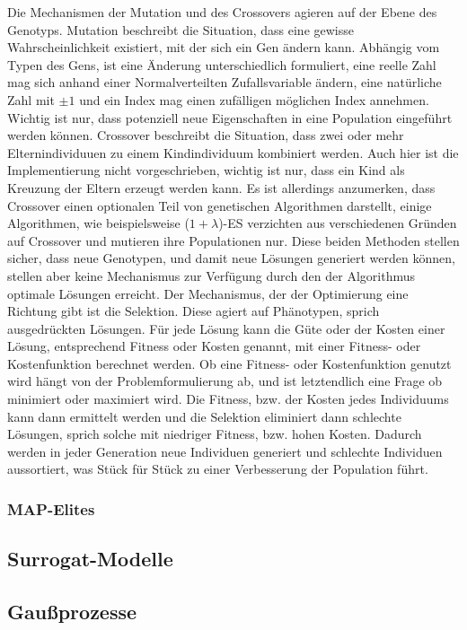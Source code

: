 Die Mechanismen der Mutation und des Crossovers agieren auf der Ebene des Genotyps.
Mutation beschreibt die Situation, dass eine gewisse Wahrscheinlichkeit existiert, mit der sich ein Gen ändern kann. Abhängig vom Typen des Gens, ist eine Änderung unterschiedlich formuliert, eine reelle Zahl mag sich anhand einer Normalverteilten Zufallsvariable ändern, eine natürliche Zahl mit $\pm1$ und ein Index mag einen zufälligen möglichen Index annehmen. Wichtig ist nur, dass potenziell neue Eigenschaften in eine Population eingeführt werden können.
Crossover beschreibt die Situation, dass zwei oder mehr Elternindividuuen zu einem Kindindividuum kombiniert werden. Auch hier ist die Implementierung nicht vorgeschrieben, wichtig ist nur, dass ein Kind als Kreuzung der Eltern erzeugt werden kann.
Es ist allerdings anzumerken, dass Crossover einen optionalen Teil von genetischen Algorithmen darstellt, einige Algorithmen, wie beispielsweise ($1 + \lambda$)-ES verzichten aus verschiedenen Gründen auf Crossover und mutieren ihre Populationen nur.
Diese beiden Methoden stellen sicher, dass neue Genotypen, und damit neue Lösungen generiert werden können, stellen aber keine Mechanismus zur Verfügung durch den der Algorithmus optimale Lösungen erreicht.
Der Mechanismus, der der Optimierung eine Richtung gibt ist die Selektion.
Diese agiert auf Phänotypen, sprich ausgedrückten Lösungen.
Für jede Lösung kann die Güte oder der Kosten einer Lösung, entsprechend Fitness oder Kosten genannt, 
mit einer Fitness- oder Kostenfunktion berechnet werden.
Ob eine Fitness- oder Kostenfunktion genutzt wird hängt von der Problemformulierung ab, und ist letztendlich eine Frage ob minimiert oder maximiert wird.
Die Fitness, bzw. der Kosten jedes Individuums kann dann ermittelt werden und die Selektion eliminiert dann schlechte Lösungen, sprich solche mit niedriger Fitness, bzw. hohen Kosten.
Dadurch werden in jeder Generation neue Individuen generiert und schlechte Individuen aussortiert, was Stück für Stück zu einer Verbesserung der Population führt.

\subsubsection{MAP-Elites}

\subsection{Surrogat-Modelle}

\subsection{Gaußprozesse}

